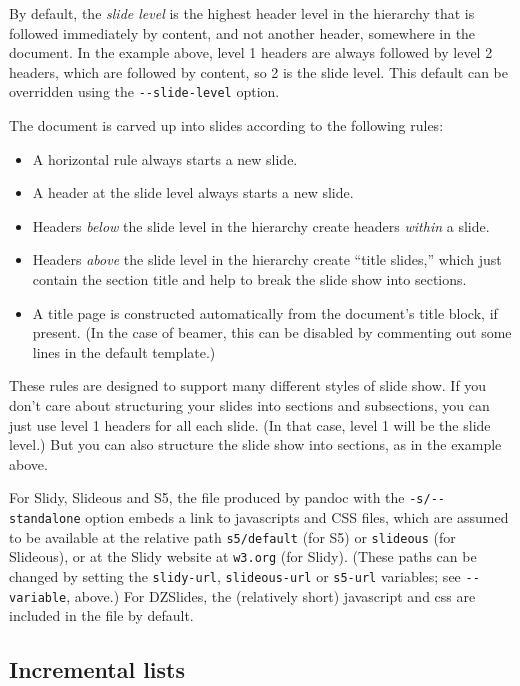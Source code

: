 \documentclass[]{article}
\begin{document}
By default, the \emph{slide level} is the highest header level in the
hierarchy that is followed immediately by content, and not another
header, somewhere in the document. In the example above, level 1 headers
are always followed by level 2 headers, which are followed by content,
so 2 is the slide level. This default can be overridden using the
\texttt{-{}-slide-level} option.

The document is carved up into slides according to the following rules:

\begin{itemize}
\item
  A horizontal rule always starts a new slide.
\item
  A header at the slide level always starts a new slide.
\item
  Headers \emph{below} the slide level in the hierarchy create headers
  \emph{within} a slide.
\item
  Headers \emph{above} the slide level in the hierarchy create ``title
  slides,'' which just contain the section title and help to break the
  slide show into sections.
\item
  A title page is constructed automatically from the document's title
  block, if present. (In the case of beamer, this can be disabled by
  commenting out some lines in the default template.)
\end{itemize}

These rules are designed to support many different styles of slide show.
If you don't care about structuring your slides into sections and
subsections, you can just use level 1 headers for all each slide. (In
that case, level 1 will be the slide level.) But you can also structure
the slide show into sections, as in the example above.

For Slidy, Slideous and S5, the file produced by pandoc with the
\texttt{-s/-{}-standalone} option embeds a link to javascripts and CSS
files, which are assumed to be available at the relative path
\texttt{s5/default} (for S5) or \texttt{slideous} (for Slideous), or at
the Slidy website at \texttt{w3.org} (for Slidy). (These paths can be
changed by setting the \texttt{slidy-url}, \texttt{slideous-url} or
\texttt{s5-url} variables; see \texttt{-{}-variable}, above.) For
DZSlides, the (relatively short) javascript and css are included in the
file by default.

\subsection{Incremental lists}
\end{document}
